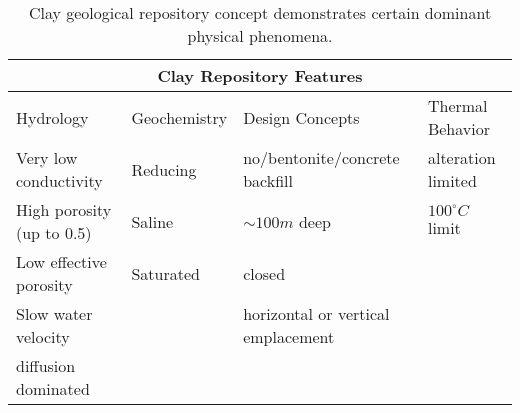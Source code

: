 %
\begin{table}[h!]
  \centering
  \footnotesize{
  \begin{tabular}{|l|l|l|l|}
    \multicolumn{4}{c}{\textbf{Clay Repository Features}}\\
    \hline
     Hydrology & Geochemistry & Design Concepts & Thermal Behavior \\ 
    \hline
    Very low conductivity&Reducing&no/bentonite/concrete backfill &alteration limited\\
    High porosity (up to 0.5)&Saline&$\sim100m$ deep&$100^\circ C$ limit \\
    Low effective porosity&Saturated&closed&\\
    Slow water velocity &&horizontal or vertical emplacement&\\
    diffusion dominated &&&\\
    \hline
  \end{tabular}
  \caption[Clay Repository Features]{Clay geological repository 
  concept demonstrates certain dominant physical phenomena. }
  \label{tab:clay_tab}
  }
\end{table}


